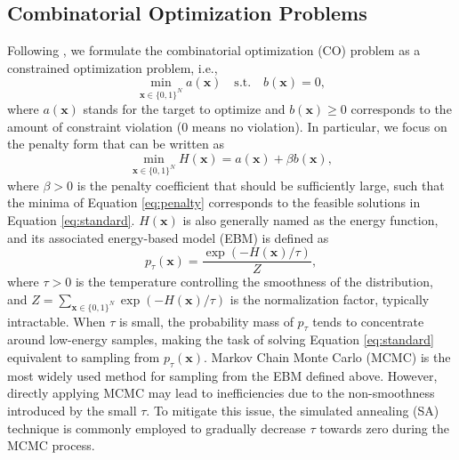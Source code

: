\subsection{Combinatorial Optimization Problems}
Following \citet{Papadimitriou1982CO}, we formulate the combinatorial optimization (CO) problem as a constrained optimization problem, i.e., 
\begin{equation}
\label{eq:standard}
    \min_{\mathbf{x}\in\{0,1\}^N} a(\mathbf{x}) \quad \text{s.t.} \quad b(\mathbf{x})=0,
\end{equation}
where $a(\mathbf{x})$ stands for the target to optimize and $b(\mathbf{x})\geq 0$ corresponds to the amount of constraint violation ($0$ means no violation). In particular, we focus on the penalty form that can be written as
\begin{equation}
\label{eq:penalty}
    \min_{\mathbf{x}\in\{0,1\}^N} H(\mathbf{x})=a(\mathbf{x})+\beta b(\mathbf{x}),
\end{equation}
where $\beta>0$ is the penalty coefficient that should be sufficiently large, such that the minima of Equation \ref{eq:penalty} corresponds to the feasible solutions in Equation \ref{eq:standard}. \( H(\mathbf{x}) \) is also generally named as the energy function, and its associated energy-based model (EBM) is defined as
\begin{equation}
\label{eq:ebm}
    p_{\tau}(\mathbf{x}) = \frac{\exp(-H(\mathbf{x})/\tau)}{Z},
\end{equation}
where $\tau>0$ is the temperature  controlling the smoothness of the distribution, and \( Z = \sum_{\mathbf{x} \in \{0,1\}^N} \exp(-H(\mathbf{x})/\tau) \) is the normalization factor, typically intractable. When $\tau$ is small, the probability mass of \( p_{\tau} \) tends to concentrate around low-energy samples, making the task of solving Equation \ref{eq:standard} equivalent to sampling from \( p_{\tau}(\mathbf{x}) \). Markov Chain Monte Carlo (MCMC) \citep{Lecun2006ebm} is the most widely used method for sampling from the EBM defined above. However, directly applying MCMC may lead to inefficiencies due to the non-smoothness introduced by the small \( \tau \). To mitigate this issue, the simulated annealing (SA) technique is commonly employed to gradually decrease \( \tau \) towards zero during the MCMC process.

